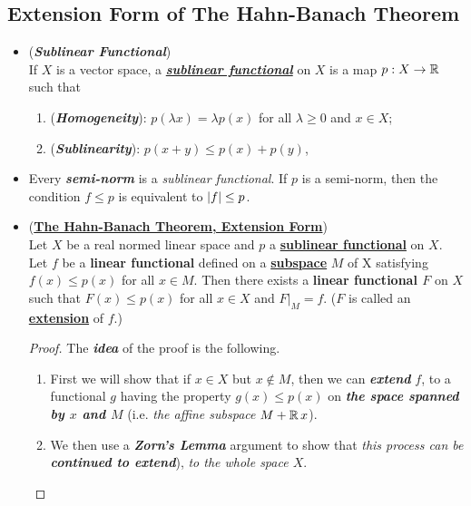 \documentclass[11pt]{article}
\begin{document}
\subsection{Extension Form of The Hahn-Banach Theorem}
\begin{itemize}
\item \begin{definition} (\emph{\textbf{Sublinear Functional}})\\
If $X$ is a vector space, a \underline{\emph{\textbf{sublinear functional}}} on $X$ is a map $p: X \rightarrow {\mathbb R}$ such that 
\begin{enumerate}
\item (\emph{\textbf{Homogeneity}}): $p(\lambda x) = \lambda p(x)$ for all $\lambda \ge 0$ and $x \in X$;
\item (\emph{\textbf{Sublinearity}}): $p(x + y) \le p(x) + p(y)$,
\end{enumerate}
\end{definition}

\item \begin{example}
Every \emph{\textbf{semi-norm}} is a \emph{sublinear functional}. If $p$ is a semi-norm, then the condition $f \le p$ is equivalent to $\left\lvert f \right\rvert \le p$.
\end{example}

\item \begin{theorem} (\underline{\textbf{The Hahn-Banach Theorem, Extension Form}}) \citep{kreyszig1989introductory, reed1980methods, luenberger1997optimization, folland2013real}\\
Let $X$ be a real normed linear space and $p$ a \underline{\textbf{sublinear functional}} on $X$. Let $f$ be a \textbf{linear functional} defined on a \underline{\textbf{subspace}} $M$ of X satisfying $f(x) \le p(x)$ for all $x \in M$. Then there exists a \textbf{linear functional $F$} on $X$ such that $F(x) \le p(x)$  for all $x \in X$ and $F|_{M} = f$. ($F$ is called an \underline{\textbf{extension}} of $f$.) 
\end{theorem}
\begin{proof}
The \emph{\textbf{idea}} of the proof is the following. 
\begin{enumerate}
\item First we will show that if $x \in X$ but $x \not\in M$, then we can \emph{\textbf{extend}} $f$, to a functional $g$ having the property $g(x) \le p(x)$ on \emph{\textbf{the space spanned by $x$ and $M$}} (i.e. \emph{the affine subspace} $M + {\mathbb R}\,x$). 
\item We then use a \emph{\textbf{Zorn's Lemma}} argument to show that \emph{this process can be \textbf{continued to extend}}), \emph{to the whole space $X$}.
\end{enumerate}


\end{proof}
\end{itemize}
\end{document}
